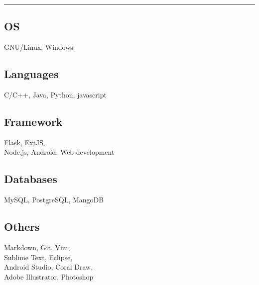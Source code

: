 
\noindent\rule{5cm}{0.4pt}
\vspace{0.2cm}

\subsection{OS}
GNU/Linux, Windows
\vspace{6pt}

\subsection{Languages}
C/C++, Java, Python, javascript
\vspace{6pt}

\subsection{Framework}
Flask, ExtJS, \\Node.js, Android,
Web-development
\vspace{6pt}

\subsection{Databases}
MySQL, PostgreSQL, MangoDB
\vspace{6pt}

\subsection{Others}
Markdown, Git, Vim, \\Sublime Text, Eclipse,\\
Android Studio, Coral Draw,\\
Adobe Illustrator, Photoshop
\sectionsep